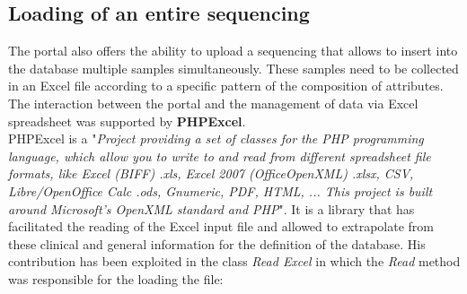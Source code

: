 \documentclass[a4paper]{report}
\begin{document}
\subsection{Loading of an entire sequencing}
The portal also offers the ability to upload a sequencing that allows to insert into the database multiple samples simultaneously. These samples need to be collected in an Excel file according to a specific pattern of the composition of attributes. The interaction between the portal and the management of data via Excel spreadsheet was supported by \textbf{PHPExcel}. \\
PHPExcel is a "\textit{Project providing a set of classes for the PHP programming language, which allow you to write to and read from different spreadsheet file formats, like Excel (BIFF) .xls, Excel 2007 (OfficeOpenXML) .xlsx, CSV, Libre/OpenOffice Calc .ods, Gnumeric, PDF, HTML, ... This project is built around Microsoft's OpenXML standard and PHP}"\cite{n}. It is a library that has facilitated the reading of the Excel input file and allowed to extrapolate from these clinical and general information for the definition of the database. His contribution has been exploited in the class \textit{Read Excel} in which the \textit{Read} method was responsible for the loading the file:
\end{document}
